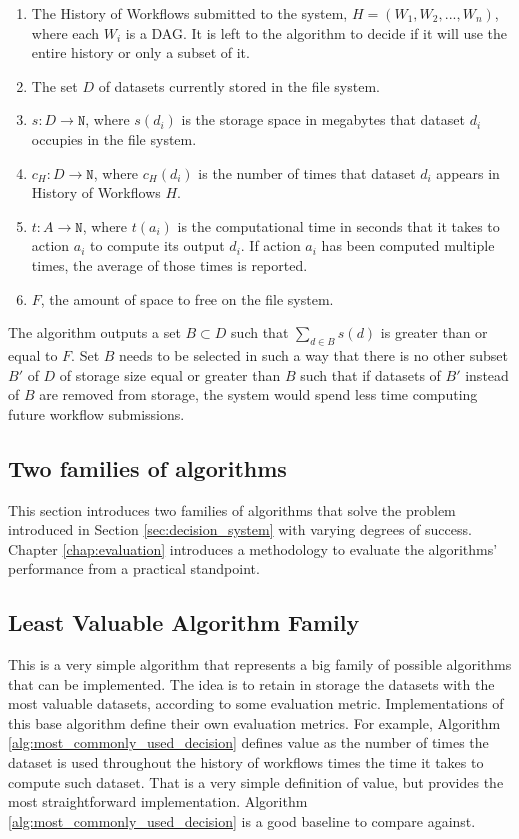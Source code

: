 \begin{enumerate}
\item The History of Workflows submitted to the system, $H = (W_1, W_2, ..., W_n)$, where each $W_i$ is a DAG. It is left to the algorithm to decide if it will use the entire history or only a subset of it.

\item The set $D$ of datasets currently stored in the file system. 

\item $s: D \to \mathtt{N} $, where $s(d_i)$ is the storage space in megabytes that dataset $d_i$ occupies in the file system.

\item $c_H: D \to \mathtt{N}$, where $c_H(d_i)$ is the number of times that dataset $d_i$ appears in History of Workflows $H$.

\item $t: A \to \mathtt{N}$, where $t(a_i)$ is the computational time in seconds that it takes to action $a_i$ to compute its output $d_i$.  If action $a_i$ has been computed multiple times, the average of those times is reported.

\item $F$, the amount of space to free on the file system.

\end{enumerate}

The algorithm outputs a set $B \subset D$ such that $\sum_{d \in B}{s(d)}$ is greater than or equal to $F$.  Set $B$ needs to be selected in such a way that there is no other subset $B'$ of $D$ of storage size equal or greater than $B$ such that if datasets of $B'$ instead of $B$ are removed from storage, the system would spend less time computing future workflow submissions. 

\subsection{Two families of algorithms}
This section introduces two families of algorithms that solve the problem introduced in Section \ref{sec:decision_system} with varying degrees of success. Chapter \ref{chap:evaluation} introduces a methodology to evaluate the algorithms' performance from a practical standpoint.

\subsection{Least Valuable Algorithm Family}
This is a very simple algorithm that represents a big family of possible algorithms that can be implemented.  The idea is to retain in storage the datasets with the most valuable datasets, according to some evaluation metric. Implementations of this base algorithm define their own evaluation metrics.  For example, Algorithm \ref{alg:most_commonly_used_decision} defines value as the number of times the dataset is used throughout the history of workflows times the time it takes to compute such dataset. That is a very simple definition of value, but provides the most straightforward implementation.  Algorithm \ref{alg:most_commonly_used_decision} is a good baseline to compare against.

